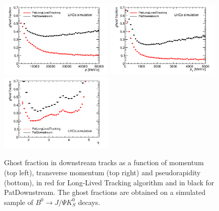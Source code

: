 \begin{figure}[tbph]
\begin{center}
\includegraphics[width = 0.49\textwidth]{figures/EffPatLLT/compare/BJpsiKSGhostFracP.png} 
\includegraphics[width = 0.49\textwidth]{figures/EffPatLLT/compare/BJpsiKSGhostFracPt.png}
\includegraphics[width = 0.49\textwidth]{figures/EffPatLLT/compare/BJpsiKSGhostFracEta.png} 
\caption{Ghost fraction in downstream tracks as a function of momentum (top left), transverse momentum (top right) and pseudorapidity (bottom), in red for Long-Lived Tracking algorithm and in black for PatDownstream. The ghost fractions are obtained on a simulated sample of $B^{0} \rightarrow J/\Psi K^{0}_{S}$ decays.}
\label{fig:ghostCompPatLLTBJpsiK}
 \end{center}
 \end{figure}


